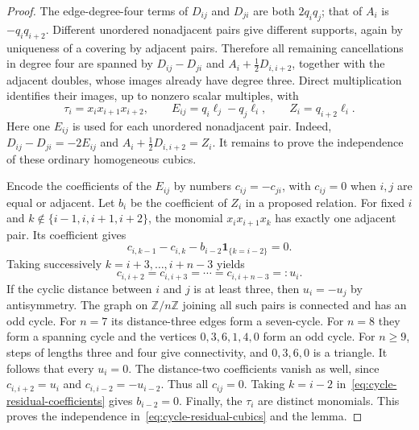 \documentclass[reqno]{article}
\theoremstyle{plain} %
\theoremstyle{definition}
\theoremstyle{remark}
\newcommand{\Z}{{\mathbb{Z}}}
\numberwithin{equation}{section}
\begin{document}
\begin{proof}
The edge-degree-four terms of $D_{ij}$ and $D_{ji}$ are both $2q_iq_j$;
that of $A_i$ is $-q_iq_{i+2}$. Different unordered nonadjacent pairs
give different supports, again by uniqueness of a covering by adjacent
pairs. Therefore all remaining cancellations in degree four are
spanned by $D_{ij}-D_{ji}$ and
$A_i+\tfrac12D_{i,i+2}$, together with the adjacent doubles, whose
images already have degree three. Direct multiplication identifies
their images, up to nonzero scalar multiples, with
\begin{equation}\label{eq:cycle-residual-cubics}
 \tau_i=x_ix_{i+1}x_{i+2},\qquad
 E_{ij}=q_i\ell_j-q_j\ell_i,\qquad
 Z_i=q_{i+2}\ell_i.
\end{equation}
Here one $E_{ij}$ is used for each unordered nonadjacent pair. Indeed,
$D_{ij}-D_{ji}=-2E_{ij}$ and
$A_i+\tfrac12D_{i,i+2}=Z_i$. It remains to prove the independence of
these ordinary homogeneous cubics.

Encode the coefficients of the $E_{ij}$ by numbers $c_{ij}=-c_{ji}$,
with $c_{ij}=0$ when $i,j$ are equal or adjacent. Let $b_i$ be the
coefficient of $Z_i$ in a proposed relation. For fixed $i$ and
$k\notin\{i-1,i,i+1,i+2\}$, the monomial $x_ix_{i+1}x_k$ has exactly
one adjacent pair. Its coefficient gives
\begin{equation}\label{eq:cycle-residual-coefficients}
 c_{i,k-1}-c_{i,k}-b_{i-2}\mathbf1_{\{k=i-2\}}=0.
\end{equation}
Taking successively $k=i+3,\ldots,i+n-3$ yields
\[
 c_{i,i+2}=c_{i,i+3}=\cdots=c_{i,i+n-3}=:u_i.
\]
If the cyclic distance between $i$ and $j$ is at least three, then
$u_i=-u_j$ by antisymmetry. The graph on $\Z/n\Z$ joining all such
pairs is connected and has an odd cycle. For $n=7$ its distance-three
edges form a seven-cycle. For $n=8$ they form a spanning cycle and the
vertices $0,3,6,1,4,0$ form an odd cycle. For $n\ge9$, steps of lengths
three and four give connectivity, and $0,3,6,0$ is a triangle. It follows
that every $u_i=0$. The distance-two coefficients vanish as well, since
$c_{i,i+2}=u_i$ and $c_{i,i-2}=-u_{i-2}$. Thus all $c_{ij}=0$.
Taking $k=i-2$ in~\eqref{eq:cycle-residual-coefficients} gives
$b_{i-2}=0$. Finally, the $\tau_i$ are distinct monomials. This proves
the independence in~\eqref{eq:cycle-residual-cubics} and the lemma.
\end{proof}
\end{document}
